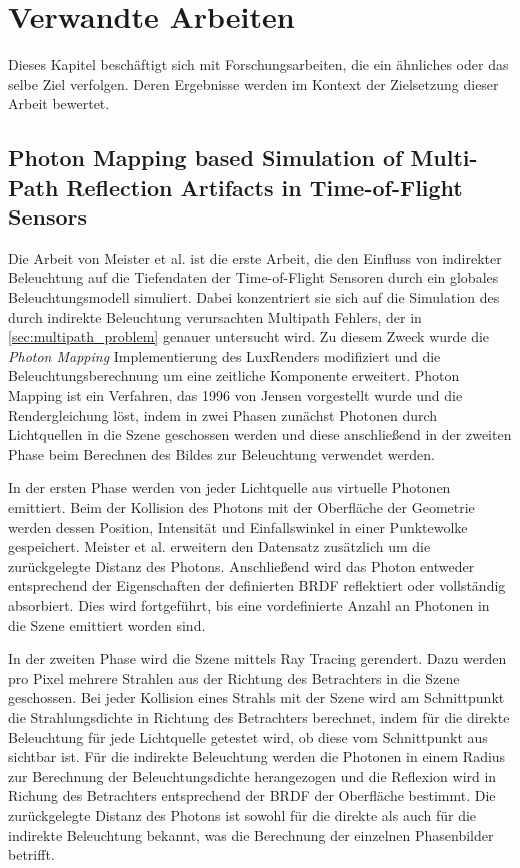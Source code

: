 \documentclass[thesis.tex]{subfiles}
\begin{document}
\chapter{Verwandte Arbeiten}
\label{chap:relatedwork}

Dieses Kapitel beschäftigt sich mit Forschungsarbeiten, die ein ähnliches oder das selbe Ziel verfolgen. Deren Ergebnisse werden im Kontext der Zielsetzung dieser Arbeit bewertet.

\section{Photon Mapping based Simulation of Multi-Path Reflection Artifacts in Time-of-Flight Sensors}

Die Arbeit von Meister et al. \cite{bib:Meister2012PhotonMB} ist die erste Arbeit, die den Einfluss von indirekter Beleuchtung auf die Tiefendaten der Time-of-Flight Sensoren durch ein globales Beleuchtungsmodell simuliert. Dabei konzentriert sie sich auf die Simulation des durch indirekte Beleuchtung verursachten Multipath Fehlers, der in \autoref{sec:multipath_problem} genauer untersucht wird. Zu diesem Zweck wurde die \emph{Photon Mapping} Implementierung des LuxRenders modifiziert und die Beleuchtungsberechnung um eine zeitliche Komponente erweitert. Photon Mapping ist ein Verfahren, das 1996 von Jensen \cite{bib:Jensen96} vorgestellt wurde und die Rendergleichung löst, indem in zwei Phasen zunächst Photonen durch Lichtquellen in die Szene geschossen werden und diese anschließend in der zweiten Phase beim Berechnen des Bildes zur Beleuchtung verwendet werden.

In der ersten Phase werden von jeder Lichtquelle aus virtuelle Photonen emittiert. Beim der Kollision des Photons mit der Oberfläche der Geometrie werden dessen Position, Intensität und Einfallswinkel in einer Punktewolke gespeichert.  Meister et al. \cite{bib:Meister2012PhotonMB} erweitern den Datensatz zusätzlich um die zurückgelegte Distanz des Photons. Anschließend wird das Photon entweder entsprechend der Eigenschaften der definierten BRDF reflektiert oder vollständig absorbiert. Dies wird fortgeführt, bis eine vordefinierte Anzahl an Photonen in die Szene emittiert worden sind.

In der zweiten Phase wird die Szene mittels Ray Tracing gerendert. Dazu werden pro Pixel mehrere Strahlen aus der Richtung des Betrachters in die Szene geschossen. Bei jeder Kollision eines Strahls mit der Szene wird am Schnittpunkt die Strahlungsdichte in Richtung des Betrachters berechnet, indem für die direkte Beleuchtung für jede Lichtquelle getestet wird, ob diese vom Schnittpunkt aus sichtbar ist. Für die indirekte Beleuchtung werden die Photonen in einem Radius zur Berechnung der Beleuchtungsdichte herangezogen und die Reflexion wird in Richung des Betrachters entsprechend der BRDF der Oberfläche bestimmt. Die zurückgelegte Distanz des Photons ist sowohl für die direkte als auch für die indirekte Beleuchtung bekannt, was die Berechnung der einzelnen Phasenbilder betrifft.
\end{document}
